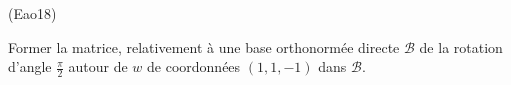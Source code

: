 \begin{tiny}(Eao18)\end{tiny} Former la matrice, relativement à une base orthonormée directe $\mathcal{B}$ de la rotation d'angle $\frac{\pi}{2}$ autour de $w$ de coordonnées $(1,1,-1)$ dans $\mathcal{B}$. 